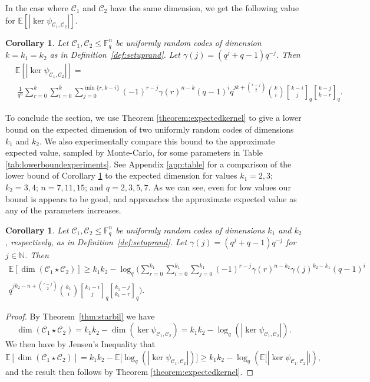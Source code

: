 \documentclass[a4paper,11pt,reqno]{article}
\newcommand{\F}{\mathbb{F}}
\newcommand{\E}{\mathbb E}
\newcommand{\C}{\mathcal{C}}
\newcommand{\qbinom}[2]{\genfrac[]{0pt}{0}{#1}{#2}}
\theoremstyle{plain} \numberwithin{equation}{section}
\newtheorem{corollary}[theorem]{Corollary}
\theoremstyle{definition}
\begin{document}
In the case where $\C_1$ and $\C_2$ have the same dimension, we get the following value for $\E[|\ker \psi_{\C_1, \C_2}|]$.

\begin{corollary}
       Let $\C_1, \C_2 \leq \F_q^n$ be uniformly random codes of dimension $k=k_1=k_2$ as in Definition~\ref{def:setuprand}. Let $\gamma(j) = (q^j + q - 1)q^{-j}$. Then 
    \begin{align*}&\E[|\ker \psi_{\C_1, \C_2}|]= \\
    &\: \frac{1}{q^{n}}\sum_{r=0}^{k}\sum^{k}_{i=0} \sum^{\min\{r, k-i\}}_{j=0} (-1)^{r-j} \gamma(r)^{n-k}(q-1)^i q^{jk + \binom{r-j}{2}} \binom{k}{i} \qbinom{k-i}{j}_q \qbinom{k-j}{k-r}_q .
\end{align*}
\end{corollary}


To conclude the section, we use Theorem \ref{theorem:expectedkernel} to give a lower bound on the expected dimension of two uniformly random codes of dimensions $k_1$ and $k_2$.  We also experimentally compare this bound to the approximate expected value, sampled by Monte-Carlo, for some parameters in Table \ref{tab:lowerboundexperiments}. See Appendix \ref{app:table} for a comparison of the lower bound of Corollary \ref{cor:lowerboundstar} to the expected dimension for values $k_1=2,3$; $k_2=3,4$; $n=7,11,15$; and $q=2,3,5,7$. As we can see, even for low values our bound is appears to be good, and approaches the approximate expected value as any of the parameters increases.

\begin{corollary} \label{cor:lowerboundstar}
    Let $\C_1, \C_2 \leq \F_q^n$ be uniformly random codes of dimensions $k_1$ and $k_2$, respectively, as in Definition~\ref{def:setuprand}. Let $\gamma(j) = (q^j+q-1)q^{-j}$ for $j\in \mathbb{N}$. Then
\begin{multline}
    \mathbb{E}[\dim (\C_1\star\C_2)] \geq k_1 k_2 - \log_q \Bigg( \sum_{r=0}^{k_1}\sum_{i=0}^{k_1}\sum_{j=0}^{k_1}(-1)^{r-j}\gamma(r)^{n-k_2}\gamma(j)^{k_2-k_1} (q-1)^i \\
    q^{jk_2-n+ \binom{r-j}{2}}\binom{k_1}{i}\qbinom{k_1-i}{j}_q \qbinom{k_1-j}{k_1-r}_q \Bigg).
\end{multline}
\end{corollary}
\begin{proof}
By Theorem~\ref{thm:starbil} we have $$\dim (\C_1\star\C_2) = k_1k_2 - \dim( \ker \psi_{\C_1,\C_2}) = k_1 k_2 - \log_q \left(|\ker \psi_{\C_1,\C_2}|\right).$$ We then have by Jensen's Inequality that 
$$\mathbb{E}[\dim (\C_1\star\C_2)] = k_1k_2 - \mathbb{E}\big[\log_q \left( |\ker \psi_{\C_1,\C_2}|\right)\big] \geq k_1k_2 - \log_q\left(\mathbb{E}\big[ |\ker \psi_{\C_1,\C_2}|\big]\right),$$ and the result then follows by Theorem \ref{theorem:expectedkernel}.
\end{proof}
\end{document}
